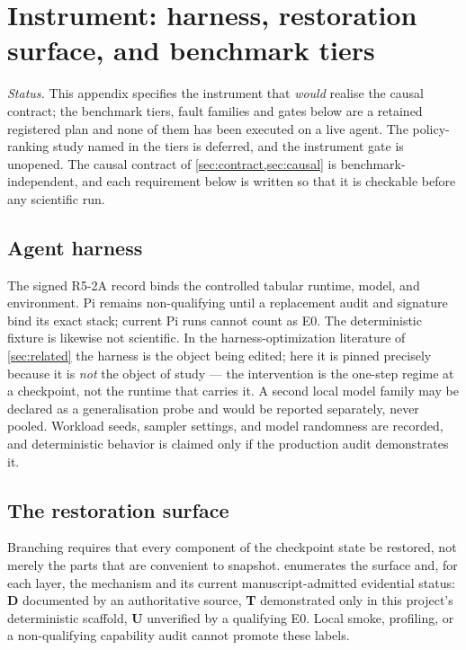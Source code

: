 \section{Instrument: harness, restoration surface, and benchmark tiers}
\label{sec:evaluation}

\emph{Status.} This appendix specifies the instrument that \emph{would} realise
the causal contract; the benchmark tiers, fault families and gates below are a
retained registered plan and none of them has been executed on a live agent.  The
policy-ranking study named in the tiers is deferred, and the instrument gate is
unopened.  The causal contract of \cref{sec:contract,sec:causal} is
benchmark-independent, and each requirement below is written so that it is
checkable before any scientific run.

\subsection{Agent harness}

The signed R5-2A record binds the controlled tabular runtime, model, and
environment.  Pi remains non-qualifying until a replacement audit and signature
bind its exact stack; current Pi runs cannot count as E0.  The deterministic
fixture is likewise not scientific.  In the
harness-optimization literature of \cref{sec:related} the harness is the object
being edited; here it is pinned precisely because it is \emph{not} the object of
study --- the intervention is the one-step regime at a checkpoint, not the
runtime that carries it.  A second local model family may be declared as a
generalisation probe and would be reported separately, never pooled.  Workload
seeds, sampler settings, and model randomness are recorded, and deterministic
behavior is claimed only if the production audit demonstrates it.

\subsection{The restoration surface}

Branching requires that every component of the checkpoint state be restored, not
merely the parts that are convenient to snapshot.  
enumerates the surface and, for each layer, the mechanism and its current
manuscript-admitted evidential status: \textbf{D} documented by an authoritative source,
\textbf{T} demonstrated only in this project's deterministic scaffold,
\textbf{U} unverified by a qualifying E0.  Local smoke, profiling, or a
non-qualifying capability audit cannot promote these labels.

